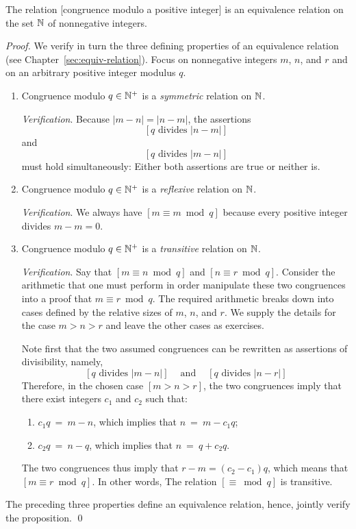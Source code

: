 \begin{prop}
\label{thm:CONGisEQUIVALENCE-REL}
The relation [congruence modulo a positive integer] is an equivalence relation on the set $\mathbb{N}$ of nonnegative integers.
\end{prop}

\begin{proof}
We verify in turn the three defining properties of an equivalence relation (see Chapter~\ref{sec:equiv-relation}).  Focus on nonnegative integers $m$, $n$, and $r$ and on an arbitrary positive integer modulus $q$.
\begin{enumerate}
\item
Congruence modulo $q \in \mathbb{N}^+$ is a {\em symmetric} relation on $\mathbb{N}$.

\smallskip

{\it Verification}.
Because $|m-n| = |n-m|$, the assertions
\[ [q \mbox{ divides } |n-m|] \]
and
\[ [q \mbox{ divides } |m-n|] \]
must hold simultaneously: Either both assertions are true or neither is.

\medskip\item
Congruence modulo $q \in \mathbb{N}^+$ is a {\em reflexive} relation on $\mathbb{N}$.

\smallskip

{\it Verification}.
We always have $[m \equiv m \bmod q]$ because every positive integer divides $m-m = 0$.

\medskip\item
Congruence modulo $q \in \mathbb{N}^+$ is a {\em transitive} relation on $\mathbb{N}$.

\smallskip

{\it Verification}.
Say that $[m \equiv n \bmod q]$ and $[n \equiv r \bmod q]$.  Consider the arithmetic that one must perform in order manipulate these two congruences into a proof that $m \equiv r \bmod q$.   The required arithmetic breaks down into cases defined by the relative sizes of $m$, $n$, and $r$.  We supply the details for the case $m > n > r$ and leave the other cases as exercises.

\smallskip

Note first that the two assumed congruences can be rewritten as assertions of divisibility, namely, \[ [q \mbox{ divides } |m-n|] \ \ \ \ \mbox{ and } \ \ \ \ [q \mbox{ divides } |n-r|] \]
Therefore, in the chosen case $[m > n > r]$, the two congruences imply that there exist integers $c_1$ and $c_2$ such that:
  \begin{enumerate}
  \item
$c_1 q \ = \ m-n$, which implies that $n \ = \ m - c_1 q$;
  \medskip\item
$c_2 q \ = \ n-q$, which implies that $n \ = \ q + c_2 q$.
  \end{enumerate}
The two congruences thus imply that $r-m = (c_2-c_1) q$, which means that $[m \equiv r
\bmod q]$.  In other words, The relation $[\equiv \bmod q]$ is transitive.
\end{enumerate}
The preceding three properties define an equivalence relation, hence, jointly verify the proposition. \qed
\end{proof}

